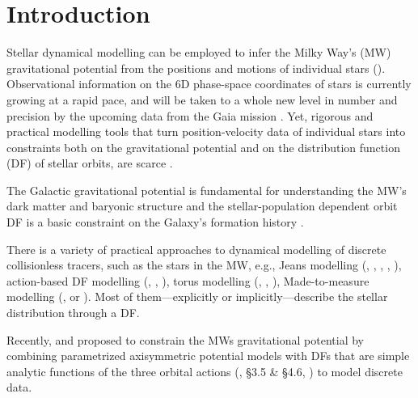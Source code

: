 \section{Introduction} \label{sec:intro}

Stellar dynamical modelling can be employed to infer the Milky Way's (MW) gravitational potential from the positions and motions of individual stars (\citealt{2008gady.book.....B,2011Prama..77...39B,2013A&ARv..21...61R}). Observational information on the 6D phase-space coordinates of stars is currently growing at a rapid pace, and will be taken to a whole new level in number and precision by the upcoming data from the Gaia mission \citep{2001A&A...369..339P}. Yet, rigorous and practical modelling tools that turn position-velocity data of individual stars into constraints both on the gravitational potential and on the distribution function (DF) of stellar orbits, are scarce \citep{2013A&ARv..21...61R}.

The Galactic gravitational potential is fundamental for understanding the MW's dark matter and baryonic structure \citep{2013A&ARv..21...61R,2012EPJWC..1910002M,2013PhR...531....1S,2014JPhG...41f3101R} and the stellar-population dependent orbit DF is a basic constraint on the Galaxy's formation history \citep{2013NewAR..57...29B,2013A&ARv..21...61R,2015MNRAS.449.3479S}.

There is a variety of practical approaches to dynamical modelling of discrete collisionless tracers, such as the stars in the MW, e.g., Jeans modelling (\citealt{1989MNRAS.239..605K}, \citealt{2012ApJ...756...89B}, \citealt{2012MNRAS.425.1445G}, \citealt{2013ApJ...772..108Z}, \citealt{2015MNRAS.452..956B}), action-based DF modelling (\citealt{2013ApJ...779..115B}, \citealt{2014MNRAS.445.3133P}, \citealt{2015MNRAS.449.3479S}), torus modelling (\citealt{2008MNRAS.390..429M}, \citealt{2012MNRAS.419.2251M}, \citealt{2013MNRAS.433.1411M}), Made-to-measure modelling (\citealt{sye96}, \citealt{2007MNRAS.376...71D} or \citealt{2014MNRAS.443.2112H}). Most of them---explicitly or implicitly---describe the stellar distribution through a DF. 

Recently, \citet{2012MNRAS.426.1328B} and \citet{2013ApJ...779..115B}  proposed to constrain the MWs gravitational potential by combining parametrized axisymmetric potential models with DFs that are simple analytic functions of the three orbital actions (\citealt{2008gady.book.....B}, \S 3.5 \& \S 4.6, \citealt{2011Prama..77...39B}) to model discrete data.



